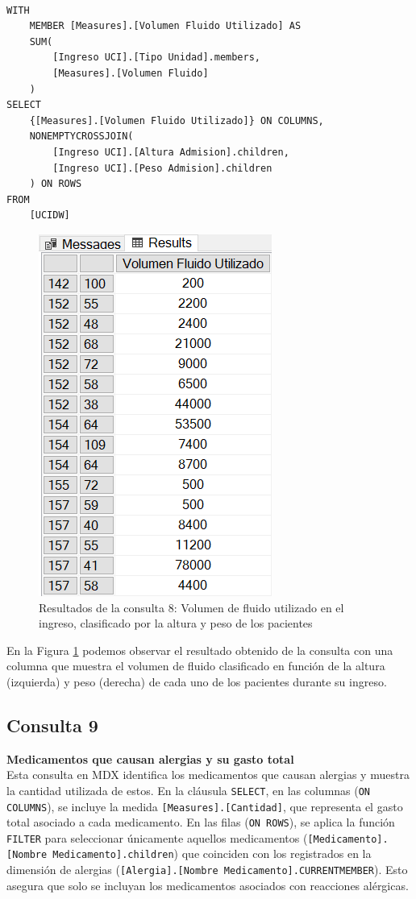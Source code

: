 \documentclass{article}
\begin{document}
\begin{lstlisting}[style=ddlstyle, label=lst:consulta8,caption=Consulta 8: Volumen de fluido utilizado en el ingreso clasificado por la altura y peso de los pacientes]
	
WITH 
	MEMBER [Measures].[Volumen Fluido Utilizado] AS 
	SUM(
		[Ingreso UCI].[Tipo Unidad].members, 
		[Measures].[Volumen Fluido]
	)
SELECT 
	{[Measures].[Volumen Fluido Utilizado]} ON COLUMNS,
	NONEMPTYCROSSJOIN(
		[Ingreso UCI].[Altura Admision].children, 
		[Ingreso UCI].[Peso Admision].children
	) ON ROWS
FROM 
	[UCIDW]
\end{lstlisting}


\begin{figure}[H]
	\centering
	\includegraphics[width=0.3\linewidth]{images/consulta8.png}
	\caption{Resultados de la consulta 8: Volumen de fluido utilizado en el ingreso, clasificado por la altura y peso de los pacientes}
	\label{fig:consulta8}
\end{figure}

En la Figura \ref{fig:consulta8} podemos observar el resultado obtenido de la consulta con una columna que muestra el volumen de fluido clasificado en función de la altura (izquierda) y peso (derecha) de cada uno de los pacientes durante su ingreso.

\subsection{Consulta 9}

\textbf{Medicamentos que causan alergias y su gasto total}
\\

Esta consulta en MDX identifica los medicamentos que causan alergias y muestra la cantidad utilizada de estos. En la cláusula \texttt{SELECT}, en las columnas (\texttt{ON COLUMNS}), se incluye la medida \texttt{[Measures].[Cantidad]}, que representa el gasto total asociado a cada medicamento. En las filas (\texttt{ON ROWS}), se aplica la función \texttt{FILTER} para seleccionar únicamente aquellos medicamentos (\texttt{[Medicamento].[Nombre Medicamento].children}) que coinciden con los registrados en la dimensión de alergias (\texttt{[Alergia].[Nombre Medicamento].CURRENTMEMBER}). Esto asegura que solo se incluyan los medicamentos asociados con reacciones alérgicas.
\\
\end{document}
